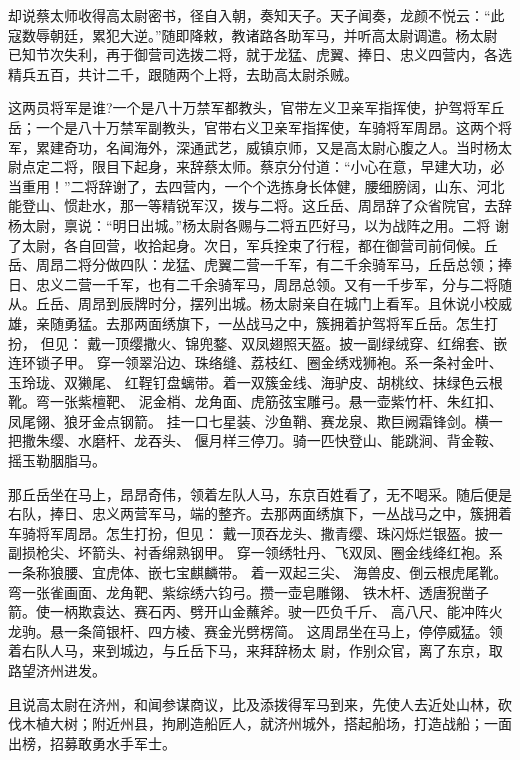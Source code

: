却说蔡太师收得高太尉密书，径自入朝，奏知天子。天子闻奏，龙颜不悦云：“此
寇数辱朝廷，累犯大逆。”随即降敕，教诸路各助军马，并听高太尉调遣。杨太尉
已知节次失利，再于御营司选拨二将，就于龙猛、虎翼、捧日、忠义四营内，各选
精兵五百，共计二千，跟随两个上将，去助高太尉杀贼。

这两员将军是谁?一个是八十万禁军都教头，官带左义卫亲军指挥使，护驾将军丘
岳；一个是八十万禁军副教头，官带右义卫亲军指挥使，车骑将军周昂。这两个将
军，累建奇功，名闻海外，深通武艺，威镇京师，又是高太尉心腹之人。当时杨太
尉点定二将，限目下起身，来辞蔡太师。蔡京分付道：“小心在意，早建大功，必
当重用！”二将辞谢了，去四营内，一个个选拣身长体健，腰细膀阔，山东、河北
能登山、惯赴水，那一等精锐军汉，拨与二将。这丘岳、周昂辞了众省院官，去辞
杨太尉，禀说：“明日出城。”杨太尉各赐与二将五匹好马，以为战阵之用。二将
谢了太尉，各自回营，收拾起身。次日，军兵拴束了行程，都在御营司前伺候。丘
岳、周昂二将分做四队：龙猛、虎翼二营一千军，有二千余骑军马，丘岳总领；捧
日、忠义二营一千军，也有二千余骑军马，周昂总领。又有一千步军，分与二将随
从。丘岳、周昂到辰牌时分，摆列出城。杨太尉亲自在城门上看军。且休说小校威
雄，亲随勇猛。去那两面绣旗下，一丛战马之中，簇拥着护驾将军丘岳。怎生打扮，
但见：
戴一顶缨撒火、锦兜鍪、双凤翅照天盔。披一副绿绒穿、红绵套、嵌连环锁子甲。
穿一领翠沿边、珠络缝、荔枝红、圈金绣戏狮袍。系一条衬金叶、玉玲珑、双獭尾、
红鞓钉盘螭带。着一双簇金线、海驴皮、胡桃纹、抹绿色云根靴。弯一张紫檀靶、
泥金梢、龙角面、虎筋弦宝雕弓。悬一壶紫竹杆、朱红扣、凤尾翎、狼牙金点钢箭。
挂一口七星装、沙鱼鞘、赛龙泉、欺巨阙霜锋剑。横一把撒朱缨、水磨杆、龙吞头、
偃月样三停刀。骑一匹快登山、能跳涧、背金鞍、摇玉勒胭脂马。

那丘岳坐在马上，昂昂奇伟，领着左队人马，东京百姓看了，无不喝采。随后便是
右队，捧日、忠义两营军马，端的整齐。去那两面绣旗下，一丛战马之中，簇拥着
车骑将军周昂。怎生打扮，但见：
戴一顶吞龙头、撒青缨、珠闪烁烂银盔。披一副损枪尖、坏箭头、衬香绵熟钢甲。
穿一领绣牡丹、飞双凤、圈金线绛红袍。系一条称狼腰、宜虎体、嵌七宝麒麟带。
着一双起三尖、
海兽皮、倒云根虎尾靴。弯一张雀画面、龙角靶、紫综绣六钧弓。攒一壶皂雕翎、
铁木杆、透唐猊凿子箭。使一柄欺袁达、赛石丙、劈开山金蘸斧。驶一匹负千斤、
高八尺、能冲阵火龙驹。悬一条简银杆、四方棱、赛金光劈楞简。
这周昂坐在马上，停停威猛。领着右队人马，来到城边，与丘岳下马，来拜辞杨太
尉，作别众官，离了东京，取路望济州进发。

且说高太尉在济州，和闻参谋商议，比及添拨得军马到来，先使人去近处山林，砍
伐木植大树；附近州县，拘刷造船匠人，就济州城外，搭起船场，打造战船；一面
出榜，招募敢勇水手军士。

